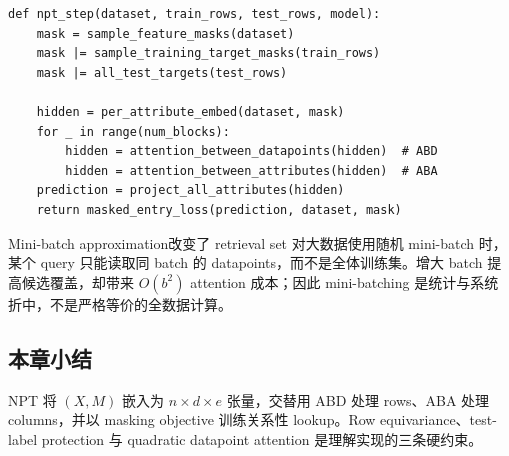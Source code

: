 
\begin{lstlisting}[caption={NPT forward 与随机 mask 的概念性伪代码。}]
def npt_step(dataset, train_rows, test_rows, model):
    mask = sample_feature_masks(dataset)
    mask |= sample_training_target_masks(train_rows)
    mask |= all_test_targets(test_rows)

    hidden = per_attribute_embed(dataset, mask)
    for _ in range(num_blocks):
        hidden = attention_between_datapoints(hidden)  # ABD
        hidden = attention_between_attributes(hidden)  # ABA
    prediction = project_all_attributes(hidden)
    return masked_entry_loss(prediction, dataset, mask)
\end{lstlisting}

\begin{warningbox}{Mini-batch approximation改变了 retrieval set}
对大数据使用随机 mini-batch 时，某个 query 只能读取同 batch 的 datapoints，而不是全体训练集。增大 batch 提高候选覆盖，却带来 $O(b^2)$ attention 成本；因此 mini-batching 是统计与系统折中，不是严格等价的全数据计算。
\end{warningbox}


\subsection{本章小结}

NPT 将 $(X,M)$ 嵌入为 $n\times d\times e$ 张量，交替用 ABD 处理 rows、ABA 处理 columns，并以 masking objective 训练关系性 lookup。Row equivariance、test-label protection 与 quadratic datapoint attention 是理解实现的三条硬约束。

